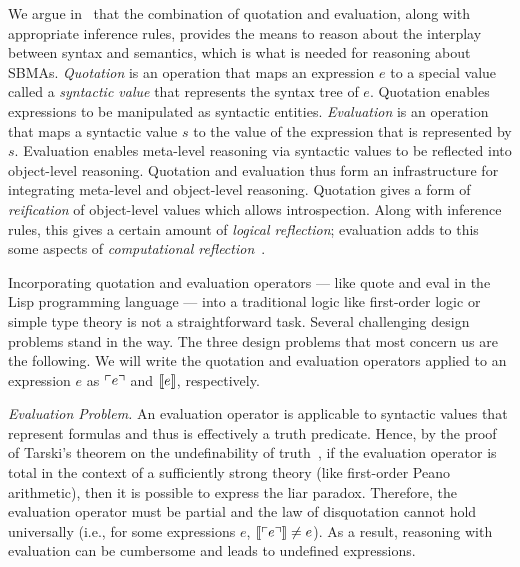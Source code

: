 \documentclass[fleqn]{llncs}
\begin{document}
We argue in~\cite{Farmer13} that the combination of quotation and
evaluation, along with appropriate inference rules, provides the means
to reason about the interplay between syntax and semantics, which is
what is needed for reasoning about SBMAs.  \emph{Quotation} is an
operation that maps an expression $e$ to a special value called a
\emph{syntactic value} that represents the syntax tree of $e$.
Quotation enables expressions to be manipulated as syntactic entities.
\emph{Evaluation} is an operation that maps a syntactic value $s$ to
the value of the expression that is represented by $s$.  Evaluation
enables meta-level reasoning via syntactic values to be reflected into
object-level reasoning.  Quotation and evaluation thus form an
infrastructure for integrating meta-level and object-level
reasoning. Quotation gives a form of \emph{reification} of
object-level values which allows introspection.  Along with inference
rules, this gives a certain amount of {\emph{logical reflection}};
evaluation adds to this some aspects of {\emph{computational
    reflection}}~\cite{Costantini02,Harrison95}.

Incorporating quotation and evaluation operators --- like quote and
eval in the Lisp programming language --- into a traditional logic
like first-order logic or simple type theory is not a straightforward
task.  Several challenging design problems stand in the way.  The
three design problems that most concern us are the following.  We will
write the quotation and evaluation operators applied to an expression
$e$ as $\ulcorner e\urcorner$ and $\llbracket e\rrbracket$, respectively.

\be

  \item \emph{Evaluation Problem.}  An evaluation operator is
    applicable to syntactic values that represent formulas and thus is
    effectively a truth predicate.  Hence, by the proof of Tarski's
    theorem on the undefinability of truth~\cite{Tarski35a}, if the
    evaluation operator is total in the context of a sufficiently
    strong theory (like first-order Peano arithmetic), then it is
    possible to express the liar paradox.  Therefore, the evaluation
    operator must be partial and the law of disquotation cannot hold
    universally (i.e., for some expressions $e$,
    $\llbracket\ulcorner e\urcorner\rrbracket \not= e$).  As a result, reasoning with
    evaluation can be cumbersome and leads to undefined expressions.
\end{document}
